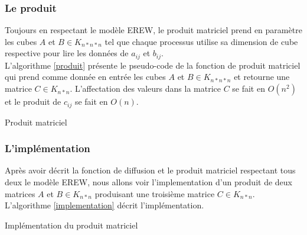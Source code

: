 \subsubsection{Le produit}

Toujours en respectant le modèle EREW, le produit matriciel prend en paramètre les cubes $A$ et $B \in K_{n*n*n}$ tel que chaque processus utilise sa dimension de cube respective pour lire les données de $a_{ij}$ et $b_{ij}$.\\

L'algorithme \ref{produit} présente le pseudo-code de la fonction de produit matriciel qui prend comme donnée en entrée les cubes $A$ et $B \in K_{n*n*n}$ et retourne une matrice $C \in K_{n*n}$. L'affectation des valeurs dans la matrice $C$ se fait en $O(n^2)$ et le produit de $c_{ij}$ se fait en $O(n)$.

\incmargin{1em}
\begin{algorithm}[here]
  \dontprintsemicolon
  \label{produit}
  \caption{Produit matriciel}
\end{algorithm}
\decmargin{1em}

\subsubsection{L'implémentation}

Après avoir décrit la fonction de diffusion et le produit matriciel respectant tous deux le modèle EREW, nous allons voir l'implementation d'un produit de deux matrices $A$ et $B \in K_{n*n}$ produisant une troisième matrice $C \in K_{n*n}$.\\

L'algorithme \ref{implementation} décrit l'implémentation.

\incmargin{1em}
\begin{algorithm}[here]
  \dontprintsemicolon
  \label{implementation}
  \caption{Implémentation du produit matriciel}
\end{algorithm}
\decmargin{1em}
